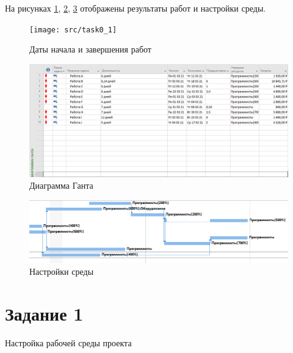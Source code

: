 На рисунках \ref{fig:task01}, \ref{fig:task02}, \ref{fig:task03} отображены результаты работ и настройки среды.

\begin{figure}[H]
	\centering
	\texttt{[image: src/task0\_1]}
	\caption{Даты начала и завершения работ}
	\label{fig:task01}
\end{figure}
\begin{figure}[H]
	\centering
	\includegraphics[width=0.7\linewidth]{src/task0_2}
	\caption{Диаграмма Ганта}
	\label{fig:task02}
\end{figure}
\begin{figure}[H]
	\centering
	\includegraphics[width=0.7\linewidth]{src/task0_3}
	\caption{Настройки среды}
	\label{fig:task03}
\end{figure}

\section{Задание 1}
Настройка рабочей среды проекта

